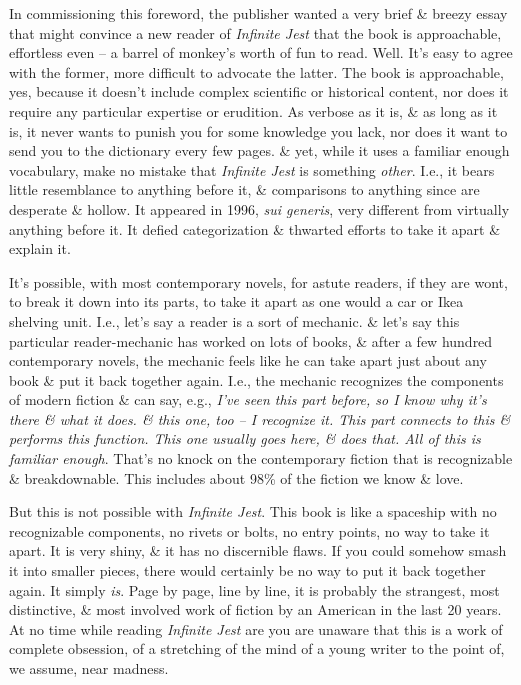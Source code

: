\documentclass{article}
\numberwithin{equation}{section}
\begin{document}
In commissioning this foreword, the publisher wanted a very brief \& breezy essay that might convince a new reader of \textit{Infinite Jest} that the book is approachable, effortless even -- a barrel of monkey's worth of fun to read. Well. It's easy to agree with the former, more difficult to advocate the latter. The book is approachable, yes, because it doesn't include complex scientific or historical content, nor does it require any particular expertise or erudition. As verbose as it is, \& as long as it is, it never wants to punish you for some knowledge you lack, nor does it want to send you to the dictionary every few pages. \& yet, while it uses a familiar enough vocabulary, make no mistake that \textit{Infinite Jest} is something \textit{other}. I.e., it bears little resemblance to anything before it, \& comparisons to anything since are desperate \& hollow. It appeared in 1996, \textit{sui generis}, very different from virtually anything before it. It defied categorization \& thwarted efforts to take it apart \& explain it.

It's possible, with most contemporary novels, for astute readers, if they are wont, to break it down into its parts, to take it apart as one would a car or Ikea shelving unit. I.e., let's say a reader is a sort of mechanic. \& let's say this particular reader-mechanic has worked on lots of books, \& after a few hundred contemporary novels, the mechanic feels like he can take apart just about any book \& put it back together again. I.e., the mechanic recognizes the components of modern fiction \& can say, e.g., \textit{I've seen this part before, so I know why it's there \& what it does. \& this one, too -- I recognize it. This part connects to this \& performs this function. This one usually goes here, \& does that. All of this is familiar enough}. That's no knock on the contemporary fiction that is recognizable \& breakdownable. This includes about 98\% of the fiction we know \& love.

But this is not possible with \textit{Infinite Jest}. This book is like a spaceship with no recognizable components, no rivets or bolts, no entry points, no way to take it apart. It is very shiny, \& it has no discernible flaws. If you could somehow smash it into smaller pieces, there would certainly be no way to put it back together again. It simply \textit{is}. Page by page, line by line, it is probably the strangest, most distinctive, \& most involved work of fiction by an American in the last 20 years. At no time while reading \textit{Infinite Jest} are you are unaware that this is a work of complete obsession, of a stretching of the mind of a young writer to the point of, we assume, near madness.
\end{document}
